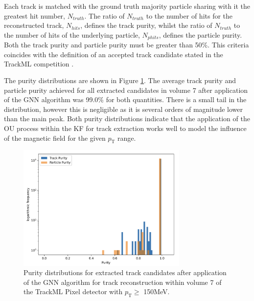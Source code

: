 



Each track is matched with the ground truth majority particle sharing with it the greatest hit number, $N_{truth}$. The ratio of $N_{truth}$ to the number of hits for the reconstructed track, $N_{hits}$, defines the track purity, whilst the ratio of $N_{truth}$ to the number of hits of the underlying particle, $N_{phits}$, defines the particle purity. Both the track purity and particle purity must be greater than 50\%. This criteria coincides with the definition of an accepted track candidate stated in the TrackML competition \cite{kaggle-trackml}.

The purity distributions are shown in Figure \ref{fig:trackml-results-endcap-purity}. The average track purity and particle purity achieved for all extracted candidates in volume 7 after application of the GNN algorithm was 99.0\% for both quantities. There is a small tail in the distribution, however this is negligible as it is several orders of magnitude lower than the main peak. Both purity distributions indicate that the application of the OU process within the KF for track extraction works well to model the influence of the magnetic field for the given $p_{\text{T}}$ range.

\begin{figure}[htbp]
    \centering
    \includegraphics[width=0.75\textwidth]{images/7-results/endcap-purity-log.png}
    \caption{Purity distributions for extracted track candidates after application of the GNN algorithm for track reconstruction within volume 7 of the TrackML Pixel detector with $p_{\text{T}} \geq$ 150MeV.}
    \label{fig:trackml-results-endcap-purity}%
\end{figure}


